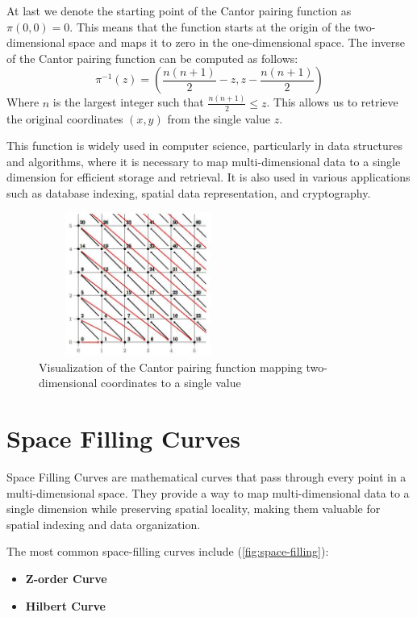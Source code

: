 At last we denote the starting point of the Cantor pairing function as \( \pi(0, 0) = 0 \). This means that the function starts at the origin of the two-dimensional space and maps it to zero in the one-dimensional space. The inverse of the Cantor pairing function can be computed as follows:
\[
    \pi^{-1}(z) = \left( \frac{n(n + 1)}{2} - z, z - \frac{n(n + 1)}{2} \right)
\]
Where \( n \) is the largest integer such that \( \frac{n(n + 1)}{2} \leq z \). This allows us to retrieve the original coordinates \( (x, y) \) from the single value \( z \).

This function is widely used in computer science, particularly in data structures and algorithms, where it is necessary to map multi-dimensional data to a single dimension for efficient storage and retrieval. It is also used in various applications such as database indexing, spatial data representation, and cryptography.


\vspace{5mm}

\begin{figure}[h]
    \centering
    \includegraphics[width=6.5cm,height=4.7cm]{img/cantor-pairing.jpg}
    \caption{Visualization of the Cantor pairing function mapping two-dimensional coordinates to a single value}
    \label{fig:cantor}
\end{figure}

\vspace{5mm}

\section{Space Filling Curves}
Space Filling Curves are mathematical curves that pass through every point in a multi-dimensional space. They provide a way to map multi-dimensional data to a single dimension while preserving spatial locality, making them valuable for spatial indexing and data organization.

The most common space-filling curves include (\cref{fig:space-filling}):
\begin{itemize}
    \item \textbf{Z-order Curve}
    \item \textbf{Hilbert Curve}
\end{itemize}

